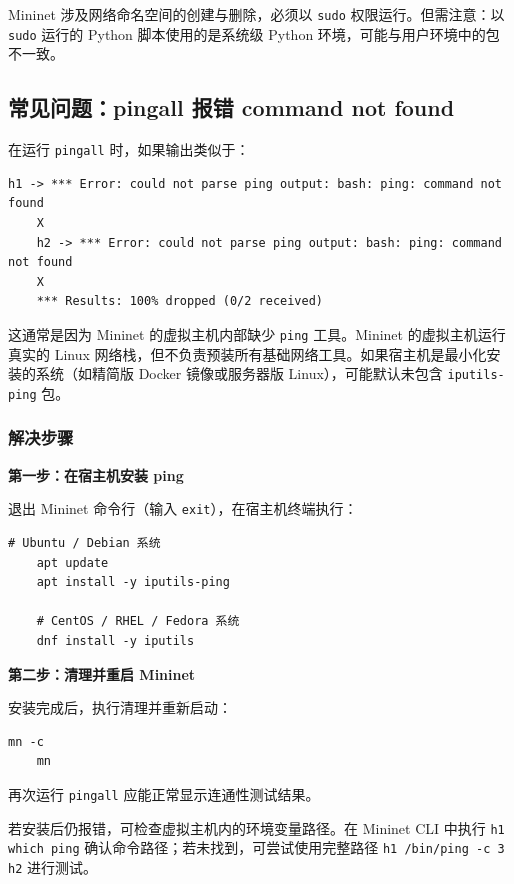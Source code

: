\documentclass[12pt,a4paper,openany]{ctexbook}
\begin{document}
\begin{warnbox}
	Mininet 涉及网络命名空间的创建与删除，必须以 \texttt{sudo} 权限运行。但需注意：以 \texttt{sudo} 运行的 Python 脚本使用的是系统级 Python 环境，可能与用户环境中的包不一致。
\end{warnbox}

\subsection{常见问题：pingall 报错 command not found}

在运行 \texttt{pingall} 时，如果输出类似于：
\begin{lstlisting}[style=bashstyle]
	h1 -> *** Error: could not parse ping output: bash: ping: command not found
	X
	h2 -> *** Error: could not parse ping output: bash: ping: command not found
	X
	*** Results: 100% dropped (0/2 received)
\end{lstlisting}

这通常是因为 Mininet 的虚拟主机内部缺少 \texttt{ping} 工具。Mininet 的虚拟主机运行真实的 Linux 网络栈，但不负责预装所有基础网络工具。如果宿主机是最小化安装的系统（如精简版 Docker 镜像或服务器版 Linux），可能默认未包含 \texttt{iputils-ping} 包。

\subsubsection{解决步骤}

\textbf{第一步：在宿主机安装 ping}

退出 Mininet 命令行（输入 \texttt{exit}），在宿主机终端执行：

\begin{lstlisting}[style=bashstyle]
	# Ubuntu / Debian 系统
	apt update
	apt install -y iputils-ping
	
	# CentOS / RHEL / Fedora 系统
	dnf install -y iputils
\end{lstlisting}

\textbf{第二步：清理并重启 Mininet}

安装完成后，执行清理并重新启动：

\begin{lstlisting}[style=bashstyle]
	mn -c
	mn
\end{lstlisting}

再次运行 \texttt{pingall} 应能正常显示连通性测试结果。

\begin{tipbox}
	若安装后仍报错，可检查虚拟主机内的环境变量路径。在 Mininet CLI 中执行 \texttt{h1 which ping} 确认命令路径；若未找到，可尝试使用完整路径 \texttt{h1 /bin/ping -c 3 h2} 进行测试。
\end{tipbox}
\end{document}
